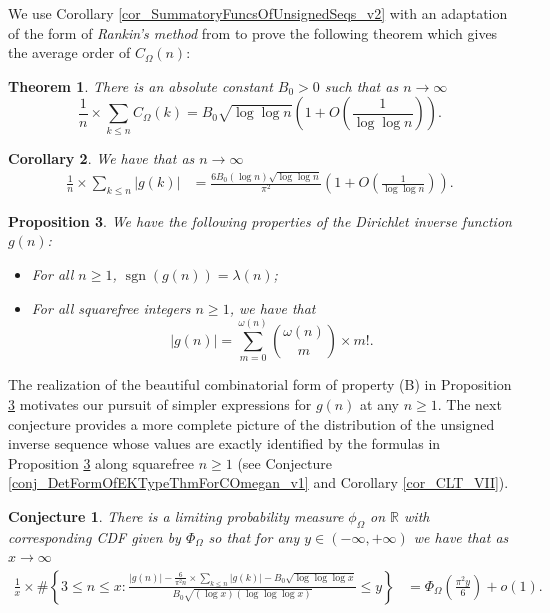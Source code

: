 \documentclass[11pt,reqno,a4letter]{article}
\newcommand{\hlocalref}[1]{\hyperref[#1]{\ref{#1}}}
\numberwithin{equation}{section}
\numberwithin{figure}{section}
\numberwithin{table}{section}
\theoremstyle{plain}
\newtheorem{theorem}{Theorem}
\newtheorem{prop}[theorem]{Proposition}
\newtheorem{cor}[theorem]{Corollary}
\numberwithin{theorem}{section}
\newtheorem*{conjecture*}{Conjecture}
\theoremstyle{definition}
\begin{document}
We use Corollary \hlocalref{cor_SummatoryFuncsOfUnsignedSeqs_v2} with 
an adaptation of the form of \emph{Rankin's method} from \cite[Thm.~7.20]{MV} 
to prove the following theorem which gives the average order of $C_{\Omega}(n)$: 

\begin{theorem} 
\label{lemma_HatCAstxSum_ExactFormulaWithError_v1} 
There is an absolute constant $B_0 > 0$ such that 
as $n \rightarrow \infty$ 
\[
\frac{1}{n} \times \sum_{k \leq n} C_{\Omega}(k) = 
B_0 \sqrt{\log\log n}\left(1 + O\left(\frac{1}{\log\log n}\right)\right). 
\] 
\end{theorem} 

\begin{cor} 
\label{cor_ExpectationFormulaAbsgInvn_v2} 
We have that as $n \rightarrow \infty$ 
\begin{align*} 
\frac{1}{n} \times \sum_{k \leq n} |g(k)| & = 
     \frac{6B_0 (\log n) \sqrt{\log\log n}}{\pi^2} 
     \left(1 + O\left(\frac{1}{\log\log n}\right)\right). 
\end{align*} 
\end{cor} 

\begin{prop} 
\label{lemma_gInv_MxExample} 
We have the following properties of the 
Dirichlet inverse function $g(n)$: 
\begin{itemize} 
\item[(A)] For all $n \geq 1$, $\operatorname{sgn}(g(n)) = \lambda(n)$; 
\item[(B)] For all squarefree integers $n \geq 1$, we have that 
     \[
     |g(n)| = \sum_{m=0}^{\omega(n)} \binom{\omega(n)}{m} \times m!. 
     \]
\end{itemize} 
\end{prop} 

The realization of the beautiful combinatorial form of property (B) 
in Proposition \hlocalref{lemma_gInv_MxExample} 
motivates our pursuit of simpler expressions for $g(n)$ at any $n \geq 1$. 
The next conjecture provides a more complete picture of the distribution of the 
unsigned inverse sequence whose values are exactly identified by the formulas in 
Proposition \ref{lemma_gInv_MxExample} along squarefree $n \geq 1$ 
(see Conjecture \ref{conj_DetFormOfEKTypeThmForCOmegan_v1} and 
Corollary \hlocalref{cor_CLT_VII}). 

\begin{conjecture*}
There is a limiting probability measure $\phi_{\Omega}$ on $\mathbb{R}$ with 
corresponding CDF given by $\Phi_{\Omega}$ so that 
for any $y \in (-\infty, +\infty)$ we have that as $x \rightarrow \infty$ 
\begin{align} 
\label{eqn_EKacVariant_forUnsgInvn_Intro_v2} 
\frac{1}{x} \times \#\left\{3 \leq n \leq x: \frac{|g(n)| - 
     \frac{6}{\pi^2 n} \times \sum_{k \leq n} |g(k)| - B_0 \sqrt{\log\log\log x}}{ 
      B_0 \sqrt{(\log x) (\log\log\log x)}} \leq y\right\} & = 
     \Phi_{\Omega}\left(\frac{\pi^2 y}{6}\right) + o(1). 
\end{align}
\end{conjecture*}
\end{document}
